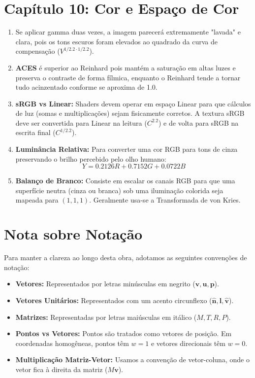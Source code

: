 \section*{Capítulo 10: Cor e Espaço de Cor}
\begin{enumerate}
    \item Se aplicar gamma duas vezes, a imagem parecerá extremamente "lavada" e clara, pois os tons escuros foram elevados ao quadrado da curva de compensação ($V^{1/2.2 \cdot 1/2.2}$).
    \item \textbf{ACES} é superior ao Reinhard pois mantém a saturação em altas luzes e preserva o contraste de forma fílmica, enquanto o Reinhard tende a tornar tudo acinzentado conforme se aproxima de 1.0.
    \item \textbf{sRGB vs Linear:} Shaders devem operar em espaço Linear para que cálculos de luz (somas e multiplicações) sejam fisicamente corretos. A textura sRGB deve ser convertida para Linear na leitura ($C^{2.2}$) e de volta para sRGB na escrita final ($C^{1/2.2}$).
    \item \textbf{Luminância Relativa:} Para converter uma cor RGB para tons de cinza preservando o brilho percebido pelo olho humano:
    \begin{equation}
    Y = 0.2126R + 0.7152G + 0.0722B
    \end{equation}
    \item \textbf{Balanço de Branco:} Consiste em escalar os canais RGB para que uma superfície neutra (cinza ou branca) sob uma iluminação colorida seja mapeada para $(1, 1, 1)$. Geralmente usa-se a Transformada de von Kries.
\end{enumerate}

\section*{Nota sobre Notação}
Para manter a clareza ao longo desta obra, adotamos as seguintes convenções de notação:
\begin{itemize}
    \item \textbf{Vetores:} Representados por letras minúsculas em negrito ($\mathbf{v}, \mathbf{u}, \mathbf{p}$).
    \item \textbf{Vetores Unitários:} Representados com um acento circunflexo ($\hat{\mathbf{n}}, \hat{\mathbf{l}}, \hat{\mathbf{v}}$).
    \item \textbf{Matrizes:} Representadas por letras maiúsculas em itálico ($M, T, R, P$).
    \item \textbf{Pontos vs Vetores:} Pontos são tratados como vetores de posição. Em coordenadas homogêneas, pontos têm $w=1$ e vetores direcionais têm $w=0$.
    \item \textbf{Multiplicação Matriz-Vetor:} Usamos a convenção de vetor-coluna, onde o vetor fica à direita da matriz ($M\mathbf{v}$).
\end{itemize}
